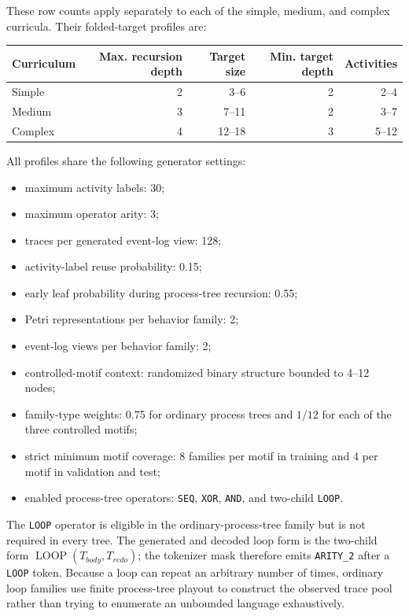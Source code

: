 \documentclass[manuscript,screen,nonacm]{acmart}
\begin{document}
These row counts apply separately to each of the simple, medium, and complex
curricula. Their folded-target profiles are:
\begin{center}
\small
\begin{tabular}{lrrrr}
\toprule
Curriculum & Max. recursion depth & Target size & Min. target depth & Activities \\
\midrule
Simple  & 2 & 3--6   & 2 & 2--4 \\
Medium  & 3 & 7--11  & 2 & 3--7 \\
Complex & 4 & 12--18 & 3 & 5--12 \\
\bottomrule
\end{tabular}
\end{center}
All profiles share the following generator settings:
\begin{itemize}
  \item maximum activity labels: 30;
  \item maximum operator arity: 3;
  \item traces per generated event-log view: 128;
  \item activity-label reuse probability: 0.15;
  \item early leaf probability during process-tree recursion: 0.55;
  \item Petri representations per behavior family: 2;
  \item event-log views per behavior family: 2;
  \item controlled-motif context: randomized binary structure bounded to 4--12 nodes;
  \item family-type weights: 0.75 for ordinary process trees and $1/12$ for
        each of the three controlled motifs;
  \item strict minimum motif coverage: 8 families per motif in training and
        4 per motif in validation and test;
  \item enabled process-tree operators: \texttt{SEQ}, \texttt{XOR},
        \texttt{AND}, and two-child \texttt{LOOP}.
\end{itemize}
The \texttt{LOOP} operator is eligible in the ordinary-process-tree family but
is not required in every tree. The
generated and decoded loop form is the two-child form
$\operatorname{LOOP}(T_{\mathit{body}},T_{\mathit{redo}})$; the tokenizer mask
therefore emits \texttt{ARITY\_2} after a \texttt{LOOP} token. Because a loop
can repeat an arbitrary number of times, ordinary loop families use finite
process-tree playout to construct the observed trace pool rather than trying to
enumerate an unbounded language exhaustively.
\end{document}
